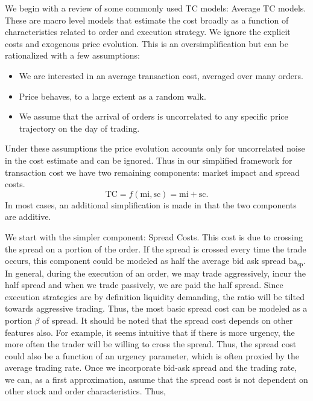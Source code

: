 We begin with a review of some commonly used TC models: Average TC models. These are macro level models that estimate the cost broadly as a function of characteristics related to order and execution strategy. We ignore the explicit costs and exogenous price evolution. This is an oversimplification but can be rationalized with a few assumptions:
        \begin{itemize}
         \item We are interested in an average transaction cost, averaged over many orders.
         \item Price behaves, to a large extent as a random walk.
         \item We assume that the arrival of orders is uncorrelated to any specific price trajectory on the day of trading. 
         \end{itemize} 


Under these assumptions the price evolution accounts only for uncorrelated noise in the cost estimate and can be ignored. Thus in our simplified framework for transaction cost we have two remaining components: market impact and spread costs.
        \begin{equation} \label{eq:tc_1}
        \text{TC}= f(\text{mi},\text{sc})= \text{mi} + \text{sc}.
        \end{equation}
In most cases, an additional simplification is made in that the two components are additive. 


We start with the simpler component: Spread Costs. This cost is due to crossing the spread on a portion of the order. If the spread is crossed every time the trade occurs, this component could be modeled as half the average bid ask spread $\text{ba}_\text{sp}$. In general, during the execution of an order, we may trade aggressively, incur the half spread and when we trade passively, we are paid the half spread. Since execution strategies are by definition liquidity demanding, the ratio will be tilted towards aggressive trading. Thus, the most basic spread cost can be modeled as a portion $\beta$ of spread. It should be noted that the spread cost depends on other features also. For example, it seems intuitive that if there is more urgency, the more often the trader will be willing to cross the spread. Thus, the spread cost could also be a function of an urgency parameter, which is often proxied by the average trading rate. Once we incorporate bid-ask spread and the trading rate, we can, as a first approximation, assume that the spread cost is not dependent on other stock and order characteristics. Thus,

